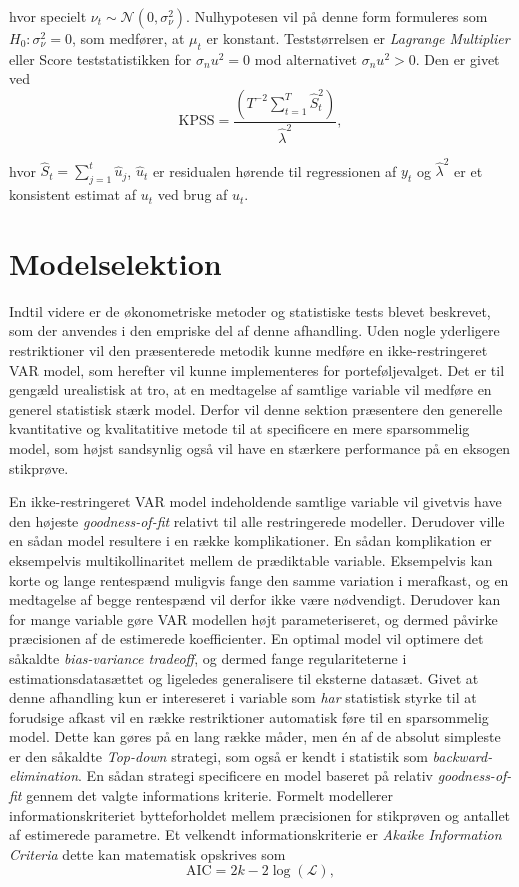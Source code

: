 \documentclass[
  a4paper,
  oneside]{memoir}
\begin{document}
hvor specielt \(\nu_t\sim\mathcal{N}(0,\sigma_\nu ^2)\). Nulhypotesen vil på denne form formuleres som \(H_0:\sigma_\nu^2=0\), som medfører, at \(\mu_t\) er konstant. Teststørrelsen er \emph{Lagrange Multiplier} eller Score teststatistikken for \(\sigma_nu ^2=0\) mod alternativet \(\sigma_nu ^2>0\). Den er givet ved
\[\text{KPSS}=\frac{(T^{-2} \sum_{t=1}^T \hat{S}_t^2)}{\hat{\lambda}^2},\]

hvor \(\hat{S}_t=\sum_{j=1}^t \hat{u}_j\), \(\hat{u}_t\) er residualen hørende til regressionen af \(y_t\) og \(\hat{\lambda}^2\) er et konsistent estimat af \(u_t\) ved brug af \(\hat{u}_t\).

\hypertarget{sekmodelselek}{%
\section{Modelselektion}\label{sekmodelselek}}

Indtil videre er de økonometriske metoder og statistiske tests blevet beskrevet, som der anvendes i den empriske del af denne afhandling. Uden nogle yderligere restriktioner vil den præsenterede metodik kunne medføre en ikke-restringeret VAR model, som herefter vil kunne implementeres for porteføljevalget. Det er til gengæld urealistisk at tro, at en medtagelse af samtlige variable vil medføre en generel statistisk stærk model. Derfor vil denne sektion præsentere den generelle kvantitative og kvalitatitive metode til at specificere en mere sparsommelig model, som højst sandsynlig også vil have en stærkere performance på en eksogen stikprøve.

En ikke-restringeret VAR model indeholdende samtlige variable vil givetvis have den højeste \emph{goodness-of-fit} relativt til alle restringerede modeller. Derudover ville en sådan model resultere i en række komplikationer. En sådan komplikation er eksempelvis multikollinaritet mellem de prædiktable variable. Eksempelvis kan korte og lange rentespænd muligvis fange den samme variation i merafkast, og en medtagelse af begge rentespænd vil derfor ikke være nødvendigt. Derudover kan for mange variable gøre VAR modellen højt parameteriseret, og dermed påvirke præcisionen af de estimerede koefficienter. En optimal model vil optimere det såkaldte \emph{bias-variance tradeoff}, og dermed fange regulariteterne i estimationsdatasættet og ligeledes generalisere til eksterne datasæt. Givet at denne afhandling kun er intereseret i variable som \emph{har} statistisk styrke til at forudsige afkast vil en række restriktioner automatisk føre til en sparsommelig model. Dette kan gøres på en lang række måder, men én af de absolut simpleste er den såkaldte \emph{Top-down} strategi, som også er kendt i statistik som \emph{backward-elimination}. En sådan strategi specificere en model baseret på relativ \emph{goodness-of-fit} gennem det valgte informations kriterie. Formelt modellerer informationskriteriet bytteforholdet mellem præcisionen for stikprøven og antallet af estimerede parametre. Et velkendt informationskriterie er \emph{Akaike Information Criteria} dette kan matematisk opskrives som
\[\text{AIC}=2k-2\log(\mathcal{L}),\]
\end{document}

